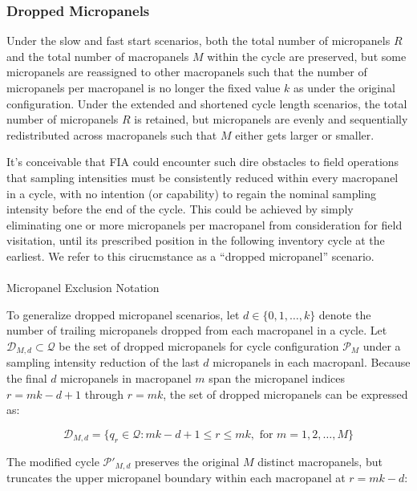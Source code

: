 \documentclass[
  number]{elsarticle}
\makeatletter
\let\oldparagraph\paragraph
\renewcommand{\paragraph}{
    \@ifstar
      \xxxParagraphStar
      \xxxParagraphNoStar
  }
\newcommand{\xxxParagraphStar}[1]{\oldparagraph*{#1}\mbox{}}
\newcommand{\xxxParagraphNoStar}[1]{\oldparagraph{#1}\mbox{}}
\makeatother
\begin{document}
\subsubsection{Dropped Micropanels}\label{dropped-micropanels}

Under the slow and fast start scenarios, both the total number of
micropanels \(R\) and the total number of macropanels \(M\) within the
cycle are preserved, but some micropanels are reassigned to other
macropanels such that the number of micropanels per macropanel is no
longer the fixed value \(k\) as under the original configuration. Under
the extended and shortened cycle length scenarios, the total number of
micropanels \(R\) is retained, but micropanels are evenly and
sequentially redistributed across macropanels such that \(M\) either
gets larger or smaller.

It's conceivable that FIA could encounter such dire obstacles to field
operations that sampling intensities must be consistently reduced within
every macropanel in a cycle, with no intention (or capability) to regain
the nominal sampling intensity before the end of the cycle. This could
be achieved by simply eliminating one or more micropanels per macropanel
from consideration for field visitation, until its prescribed position
in the following inventory cycle at the earliest. We refer to this
cirucmstance as a ``dropped micropanel'' scenario.

\paragraph{Micropanel Exclusion
Notation}\label{micropanel-exclusion-notation}

To generalize dropped micropanel scenarios, let
\(d \in \{0, 1, \dots, k\}\) denote the number of trailing micropanels
dropped from each macropanel in a cycle. Let
\(\mathcal{D}_{M,d} \subset \mathcal{Q}\) be the set of dropped
micropanels for cycle configuration \(\mathcal{P}_M\) under a sampling
intensity reduction of the last \(d\) micropanels in each macropanl.
Because the final \(d\) micropanels in macropanel \(m\) span the
micropanel indices \(r = mk - d + 1\) through \(r = mk\), the set of
dropped micropanels can be expressed as:

\[\mathcal{D}_{M,d} = \{ q_r \in \mathcal{Q} : mk - d + 1 \leq r \leq mk, \text{ for } m = 1, 2, \dots, M \}\]

The modified cycle \(\mathcal{P}'_{M,d}\) preserves the original \(M\)
distinct macropanels, but truncates the upper micropanel boundary within
each macropanel at \(r = mk - d\):
\end{document}
